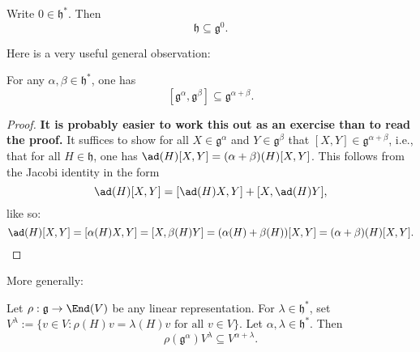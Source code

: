 \documentclass[reqno]{amsart} 
\begin{document}
\begin{exercise}
  Write $0 \in \mathfrak{h}^*$.  Then
  \begin{equation*}
    \mathfrak{h} \subseteq \mathfrak{g}^0.
  \end{equation*}
\end{exercise}

Here is a very useful general observation:
\begin{lemma}\label{lem:commutators-of-root-spaces}
  For any $\alpha,\beta \in \mathfrak{h}^*$, one has
  \begin{equation*}
    {} [\mathfrak{g}^\alpha, \mathfrak{g}^\beta] \subseteq \mathfrak{g}^{\alpha + \beta}.
  \end{equation*}
\end{lemma}
\begin{proof}
 { \bf It is probably easier to work this out as an exercise than to read the proof.  }
  It suffices to show for all $X \in \mathfrak{g}^\alpha$ and $Y \in \mathfrak{g}^\beta$ that $[X,Y] \in \mathfrak{g}^{\alpha + \beta}$, i.e., that for all $H \in \mathfrak{h}$, one has $\ad(H)[X,Y] = (\alpha + \beta)(H) [X,Y]$.  This follows from the Jacobi identity in the form
  \begin{equation}
    \ad(H) [X,Y] = [\ad(H) X, Y] + [X,\ad(H) Y],
  \end{equation}
  like so:
  \begin{equation}
    \ad(H)[X,Y] = [\alpha(H) X, Y] = [X,\beta(H) Y]
    = (\alpha(H) + \beta(H))[X,Y]
    = (\alpha + \beta)(H)[X,Y].
  \end{equation}
\end{proof}
More generally:
\begin{lemma}\label{lem:general-commutation-root-spaces-on-weight-spaces}
  Let $\rho : \mathfrak{g} \rightarrow \End(V)$ be any linear representation.  For $\lambda \in \mathfrak{h}^*$, set $V^\lambda := \{v \in V : \rho(H) v = \lambda(H) v \text{ for all } v \in V\}$.  Let $\alpha, \lambda \in \mathfrak{h}^*$.  Then
  \begin{equation*}
    \rho(\mathfrak{g}^\alpha) V^\lambda \subseteq V^{\alpha + \lambda}.
  \end{equation*}
\end{lemma}
\end{document}
